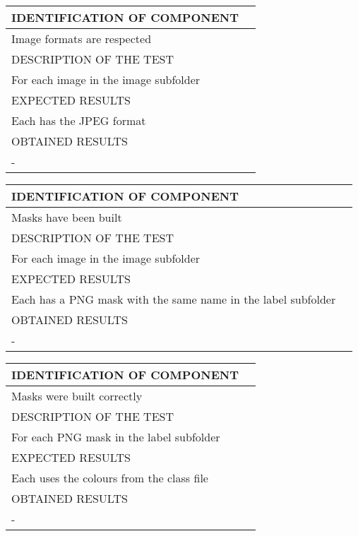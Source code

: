 \documentclass{polytech/polytech}
\numberwithin{figure}{chapter}
\begin{document}
\begin{appendix}
\begin{table}[]
\begin{tabular}{|l|l|}\hline
\color{C} IDENTIFICATION OF COMPONENT \\\hline
Image formats are respected  \\\hline
\color{C} DESCRIPTION OF THE TEST\\\hline
For each image in the image subfolder  \\\hline
\color{C} EXPECTED RESULTS \\\hline
Each has the JPEG format \\\hline
\color{C} OBTAINED RESULTS \\\hline
- \\\hline
\end{tabular}
\end{table}

\begin{table}[]
\begin{tabular}{|l|l|}\hline
\color{C} IDENTIFICATION OF COMPONENT \\\hline
Masks have been built  \\\hline
\color{C} DESCRIPTION OF THE TEST\\\hline
For each image in the image subfolder \\\hline
\color{C} EXPECTED RESULTS \\\hline
Each has a PNG mask with the same name in the label subfolder \\\hline
\color{C} OBTAINED RESULTS \\\hline
- \\\hline
\end{tabular}
\end{table}

\begin{table}[]
\begin{tabular}{|l|l|}\hline
\color{C} IDENTIFICATION OF COMPONENT \\\hline
Masks were built correctly  \\\hline
\color{C} DESCRIPTION OF THE TEST\\\hline
For each PNG mask in the label subfolder  \\\hline
\color{C} EXPECTED RESULTS \\\hline
Each uses the colours from the class file \\\hline
\color{C} OBTAINED RESULTS \\\hline
- \\\hline
\end{tabular}
\end{table}


\end{appendix}
\end{document}
